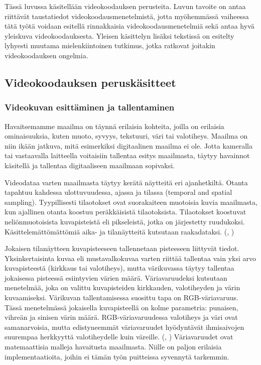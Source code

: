 Tässä luvussa käsitellään videokoodauksen perusteita. Luvun tavoite on
antaa riittävät taustatiedot videokoodausmenetelmistä, jotta myöhemmässä
vaiheessa tätä työtä voidaan esitellä rinnakkaisia
videokoodausmenetelmiä sekä antaa hyvä yleiskuva videokoodauksesta. Yleisen
käsittelyn lisäksi tekstissä on esitelty lyhyesti muutama mielenkiintoinen
tutkimus, jotka ratkovat joitakin videokoodauksen ongelmia.

\subsection{Videokoodauksen peruskäsitteet}

\subsubsection{Videokuvan esittäminen ja tallentaminen}

Havaitsemamme maailma on täynnä erilaisia kohteita, joilla on
erilaisia ominaisuuksia, kuten muoto, syvyys, tekstuuri, väri tai valotiheys.
Maailma on niin ikään jatkuva, mitä esimerkiksi digitaalinen maailma ei ole. Jotta kameralla tai vastaavalla
laitteella voitaisiin tallentaa esitys maailmasta, täytyy havainnot käsitellä ja
tallentaa digitaaliseen maailmaan sopivaksi.

Videodataa varten maailmasta täytyy kerätä näytteitä eri ajanhetkiltä. Otanta
tapahtuu kahdessa ulottuvuudessa, ajassa ja tilassa (temporal and spatial
sampling). Tyypillisesti tilaotokset ovat suorakaiteen muotoisia kuvia
maailmasta, kun ajallinen otanta koostuu peräkkäisistä tilaotoksista.
Tilaotokset koostuvat neliönmuotoisista kuvapisteistä eli pikseleistä, jotka
on järjestetty ruudukoksi. Käsittelemättömättömiä aika- ja
tilanäytteitä kutsutaan raakadataksi. (\citealt{h264}, \citealt{du})

Jokaisen tilanäytteen kuvapisteeseen tallennetaan pisteeseen liittyvät
tiedot. Yksinkertaisinta kuvaa eli mustavalkokuvaa varten riittää
tallentaa vain yksi arvo kuvapisteestä (kirkkaus tai valotiheys), mutta
värikuvassa täytyy tallentaa jokaisessa pisteessä esiintyvien värien määrä.
Väriavaruudeksi kutsutaan menetelmää, joka on valittu kuvapisteiden kirkkauden,
valotiheyden ja värin kuvaamiseksi. Värikuvan tallentamisessa suosittu tapa on
RGB-väriavaruus. Tässä menetelmässä jokaisella kuvapisteellä on
kolme parametria: punaisen, vihreän ja sinisen värin määrä. RGB-väriavaruudessa 
valotiheys ja väri ovat samanarvoisia, mutta edistyneemmät
väriavaruudet hyödyntävät ihmisaivojen suurempaa herkkyyttä valotiheydelle
kuin väreille. (\citealt{h264}, \citealt{du}) Väriavaruudet ovat matemaattisia
malleja havaitusta maailmasta. Niille on paljon erilaisia implementaatioita,
joihin ei tämän työn puitteissa syvennytä tarkemmin.

